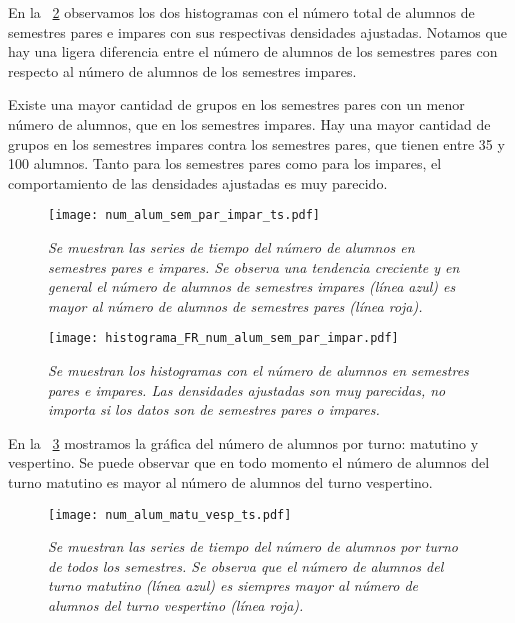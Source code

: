 En la \figurename{~\ref{histNumAlTotal_ParImpar}} observamos los dos histogramas con el número total de alumnos de semestres pares e impares con sus respectivas densidades ajustadas. Notamos que hay una ligera diferencia entre el número de alumnos de los semestres pares con respecto al número de alumnos de los semestres impares.

Existe una mayor cantidad de grupos en los semestres pares con un menor número de alumnos, que en los semestres impares. Hay una mayor cantidad de grupos en los semestres impares contra los semestres pares, que tienen entre 35 y 100 alumnos. Tanto para los semestres pares como para los impares, el comportamiento de las densidades ajustadas es muy parecido.

\begin{figure}[H]
\centering
\texttt{[image: num\_alum\_sem\_par\_impar\_ts.pdf]} %
\caption[\textit{Número de alumnos de semestres pares e impares}]{\textit{Se muestran las series de tiempo del número de alumnos en semestres pares e impares. Se observa una tendencia creciente y en general el número de alumnos de semestres impares (línea azul) es mayor al número de alumnos de semestres pares (línea roja).}}\label{NumAlTotal_ParImpar_ts}
\end{figure}

\begin{figure}[H]
\centering
\texttt{[image: histograma\_FR\_num\_alum\_sem\_par\_impar.pdf]} %
\caption[\textit{Histogramas del número de alumnos en semestres pares e impares}]{\textit{Se muestran los histogramas con el número de alumnos en semestres pares e impares. Las densidades ajustadas son muy parecidas, no importa si los datos son de semestres pares o impares.}}\label{histNumAlTotal_ParImpar}
\end{figure}


En la \figurename{~\ref{NumAlTotal_MatuVesp_ts}} mostramos la gráfica del número de alumnos por turno: matutino y vespertino. Se puede observar que en todo momento el número de alumnos del turno matutino es mayor al número de alumnos del turno vespertino.

\begin{figure}[H]
\centering
\texttt{[image: num\_alum\_matu\_vesp\_ts.pdf]} %
\caption[\textit{Número de alumnos por turno de todos los semestres}]{\textit{Se muestran las series de tiempo del número de alumnos por turno de todos los semestres. Se observa que el número de alumnos del turno matutino (línea azul) es siempres mayor al número de alumnos del turno vespertino (línea roja).}}\label{NumAlTotal_MatuVesp_ts}
\end{figure}

